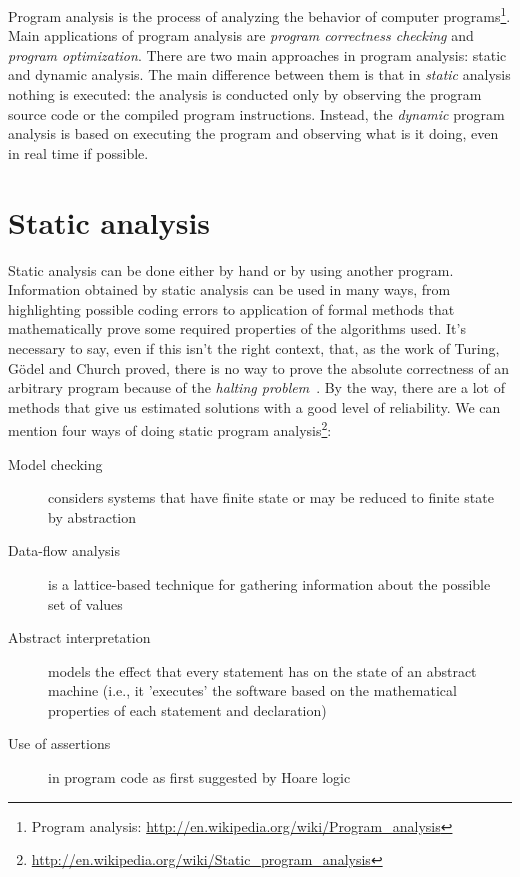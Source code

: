 \documentclass[a4paper,11pt]{report}
\begin{document}
Program analysis is the process of analyzing the behavior of computer
programs\footnote{Program analysis:
\url{http://en.wikipedia.org/wiki/Program_analysis}}. Main applications of
program analysis are \emph{program correctness checking} and \emph{program
optimization}.
There are two main approaches in program analysis: static and dynamic analysis.
The main difference between them is that in \emph{static} analysis nothing is
executed: the analysis is conducted only by observing the program source code or
the compiled program instructions. Instead, the \emph{dynamic} program analysis
is based on executing the program and observing what is it doing, even in real
time if possible.

\section{Static analysis}

Static analysis can be done either by hand or by using another program.
Information obtained by static analysis can be used in many ways, from
highlighting possible coding errors to application of formal methods that
mathematically prove some required properties of the algorithms used. It's
necessary to say, even if this isn't the right context, that, as the work of
Turing, G\"{o}del and Church proved, there is no way to prove the absolute
correctness of an arbitrary program because of the \emph{halting
problem}~\cite{Turing01}.
By the way, there are a lot of methods that give us estimated solutions with a
good level of reliability. We can mention four ways of doing static program
analysis\footnote{\url{http://en.wikipedia.org/wiki/Static_program_analysis}}:


\begin{description}
\item[Model checking] considers systems that have finite state or may be reduced to finite state by abstraction
\item[Data-flow analysis] is a lattice-based technique for gathering information about the possible set of values
\item[Abstract interpretation] models the effect that every statement has on the
state of an abstract machine (i.e., it 'executes' the software based on the
mathematical properties of each statement and declaration)
\item[Use of assertions] in program code as first suggested by Hoare
logic~\cite{Hoare01}
\end{description}
\end{document}
